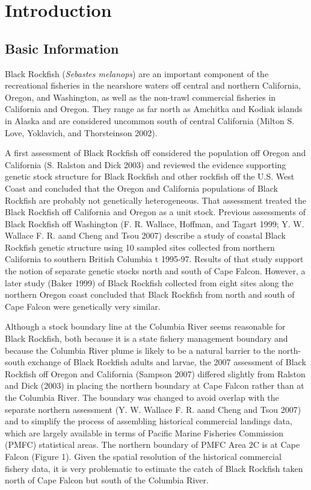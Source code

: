 \documentclass[11pt,
  english,
  letterpaper,
]{article}
\begin{document}
\hypertarget{introduction}{%
\section{Introduction}\label{introduction}}

\hypertarget{basic-information}{%
\subsection{Basic Information}\label{basic-information}}

Black Rockfish (\emph{Sebastes melanops}) are an important component of the recreational fisheries in the nearshore waters off central and northern California, Oregon, and Washington, as well as the non-trawl commercial fisheries in California and Oregon. They range as far north as Amchitka and Kodiak islands in Alaska and are considered uncommon south of central California (Milton S. Love, Yoklavich, and Thorsteinson 2002).

A first assessment of Black Rockfish off considered the population off Oregon and California (S. Ralston and Dick 2003) and reviewed the evidence supporting genetic stock structure for Black Rockfish and other rockfish off the U.S. West Coast and concluded that the Oregon and California populations of Black Rockfish are probably not genetically heterogeneous. That assessment treated the Black Rockfish off California and Oregon as a unit stock. Previous assessments of Black Rockfish off Washington (F. R. Wallace, Hoffman, and Tagart 1999; Y. W. Wallace F. R. aand Cheng and Tsou 2007) describe a study of coastal Black Rockfish genetic structure using 10 sampled sites collected from northern California to southern British Columbia t 1995-97. Results of that study support the notion of separate genetic stocks north and south of Cape Falcon. However, a later study (Baker 1999) of Black Rockfish collected from eight sites along the northern Oregon coast concluded that Black Rockfish from north and south of Cape Falcon were genetically very similar.

Although a stock boundary line at the Columbia River seems reasonable for Black Rockfish, both because it is a state fishery management boundary and because the Columbia River plume is likely to be a natural barrier to the north-south exchange of Black Rockfish adults and larvae, the 2007 assessment of Black Rockfish off Oregon and California (Sampson 2007) differed slightly from Ralston and Dick (2003) in placing the northern boundary at Cape Falcon rather than at the Columbia River. The boundary was changed to avoid overlap with the separate northern assessment (Y. W. Wallace F. R. aand Cheng and Tsou 2007) and to simplify the process of assembling historical commercial landings data, which are largely available in terms of Pacific Marine Fisheries Commission (PMFC) statistical areas. The northern boundary of PMFC Area 2C is at Cape Falcon (Figure 1). Given the spatial resolution of the historical commercial fishery data, it is very problematic to estimate the catch of Black Rockfish taken north of Cape Falcon but south of the Columbia River.
\end{document}
